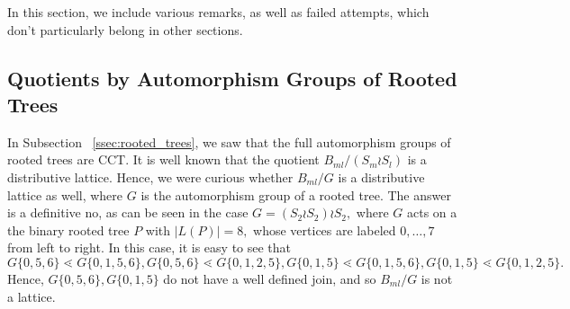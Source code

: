 \documentclass[10 pt]{amsart}
\theoremstyle{plain}
\theoremstyle{definition}
\theoremstyle{remark}
\numberwithin{equation}{section}
\theoremstyle{remark}
\newcommand\ssec{\subsection}
\begin{document}
In this section, we include various remarks, as well as failed attempts, which don't particularly belong in other sections.

\ssec{Quotients by Automorphism Groups of Rooted Trees}

In Subsection ~\ref{ssec:rooted_trees}, we saw that the full automorphism groups of rooted trees are CCT. It is well known that the quotient $B_{ml}/(S_m\wr S_l)$ is a distributive lattice. Hence, we were curious whether $B_{ml}/G$ is a distributive lattice as well, where $G$ is the automorphism group of a rooted tree. The answer is a definitive no, as can be seen in the case $G = (S_2 \wr S_2) \wr S_2,$ where $G$ acts on a the binary rooted tree $P$ with $|L(P)| = 8,$ whose vertices are labeled $0,\ldots, 7$ from left to right. In this case, it is easy to see that $G\{0,5,6\} \lessdot G\{0,1,5,6\},G\{0,5,6\} \lessdot G\{0,1,2,5\},G\{0,1,5\} \lessdot G\{0,1,5,6\},G\{0,1,5\} \lessdot G\{0,1,2,5\}.$ Hence, $G\{0,5,6\},G\{0,1,5\}$ do not have a well defined join, and so $B_{ml}/G$ is not a lattice.
\end{document}

